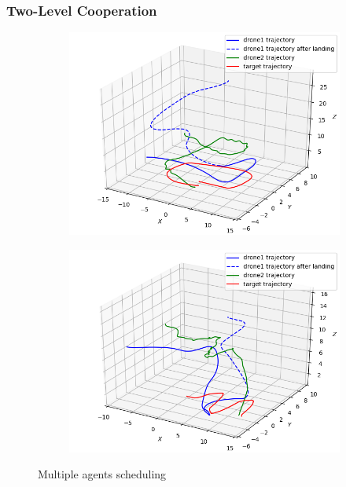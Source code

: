 \documentclass[conf]{new-aiaa}
\begin{document}
\subsubsection{Two-Level Cooperation}
\begin{figure}[H]
  \begin{subfigure}{0.5\textwidth}
    \includegraphics[width=\linewidth]{tight_square_multi_coord.png}
    \caption{} \label{fig:tight_square_multi_coord}
  \end{subfigure}%
  \hspace*{\fill}   %
  \begin{subfigure}{0.5\textwidth}
    \includegraphics[width=\linewidth]{oscillate_multi_coord.png}
    \caption{} \label{fig:oscillate_multi_coord}
  \end{subfigure}%
  \hspace*{\fill}   %
\caption{Multiple agents scheduling} \label{fig:multiple_coord}
\end{figure}
\end{document}
